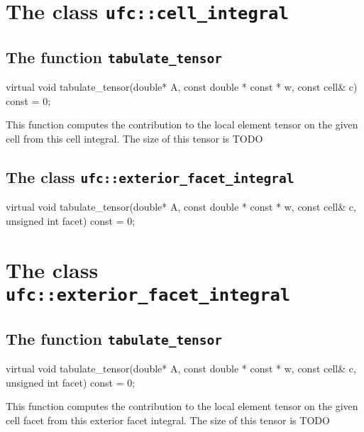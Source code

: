 \section{The class \texttt{ufc::cell\_integral}}

\subsection{The function \texttt{tabulate\_tensor}}

\begin{code}
virtual void tabulate_tensor(double* A,
                             const double * const * w,
                             const cell& c) const = 0;
\end{code}

This function computes the contribution to the local element tensor
on the given cell from this cell integral.
The size of this tensor is TODO

\subsection{The class \texttt{ufc::exterior\_facet\_integral}}

\begin{code}
virtual void tabulate_tensor(double* A,
                             const double * const * w,
                             const cell& c,
                             unsigned int facet) const = 0;
\end{code}

\section{The class \texttt{ufc::exterior\_facet\_integral}}

\subsection{The function \texttt{tabulate\_tensor}}

\begin{code}
virtual void tabulate_tensor(double* A,
                             const double * const * w,
                             const cell& c,
                             unsigned int facet) const = 0;
\end{code}

This function computes the contribution to the local element tensor
on the given cell facet from this exterior facet integral.
The size of this tensor is TODO

